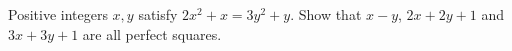 Positive integers $x,y$ satisfy $2x^2+x=3y^2+y$. Show that $x-y$, $2x+2y+1$ and $3x+3y+1$ are all perfect squares.
